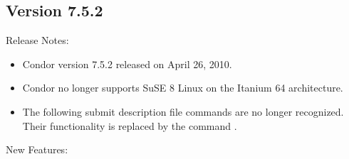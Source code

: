 \subsection*{\label{sec:New-7-5-2}Version 7.5.2}

\noindent Release Notes:

\begin{itemize}

\item Condor version 7.5.2 released on April 26, 2010.

\item Condor no longer supports SuSE 8 Linux on the Itanium 64 architecture.

\item The following submit description file commands are no longer recognized.
Their functionality is replaced by the command .

\end{itemize}


\noindent New Features:

